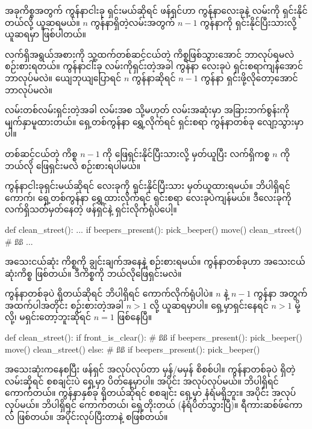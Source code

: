 အခုကိစ္စအတွက် ကွန်နာငါးခု ရှင်းမယ်ဆိုရင်  ဖန်ရှင်ဟာ ကွန်နာလေးခုနဲ့ လမ်းကို ရှင်းနိုင်တယ်လို့ ယူဆရမယ်။  $n$ ကွန်နာရှိတဲ့လမ်းအတွက် $n - 1$ ကွန်နာကို ရှင်းနိုင်ပြီးသားလို့ ယူဆရမှာ ဖြစ်ပါတယ်။


\begin{mytcbox}
လက်ရှိအရွယ်အစားကို သူ့ထက်တစ်ဆင့်ငယ်တဲ့ ကိစ္စဖြစ်သွားအောင် ဘာလုပ်ရမလဲ စဉ်းစားရတယ်။ ကွန်နာငါးခု လမ်းကိုရှင်းတဲ့အခါ ကွန်နာ လေးခုပဲ ရှင်းစရာကျန်အောင် ဘာလုပ်မလဲ။ ယျေဘုယျပြောရင် $n$ ကွန်နာဆိုရင် $n - 1$ ကွန်နာ ရှင်းဖို့လိုတော့အောင် ဘာလုပ်မလဲ။ 
\end{mytcbox}%

လမ်းတစ်လမ်းရှင်းတဲ့အခါ လမ်းအစ သို့မဟုတ် လမ်းအဆုံးမှာ အခြားဘက်စွန်းကို  မျက်နှာမူထားတယ်။ ရှေ့တစ်ကွန်နာ ရွှေ့လိုက်ရင်  ရှင်းစရာ ကွန်နာတစ်ခု လျော့သွားမှာပါ။

\begin{mytcbox}
တစ်ဆင့်ငယ်တဲ့ ကိစ္စ $n - 1$ ကို ဖြေရှင်းနိုင်ပြီးသားလို့ မှတ်ယူပြီး လက်ရှိကစ္စ $n$ ကို ဘယ်လို ဖြေရှင်းမလဲ စဉ်းစားရပါမယ်။
\end{mytcbox}%

ကွန်နာငါးခုရှင်းမယ်ဆိုရင် လေးခုကို ရှင်းနိုင်ပြီးသား မှတ်ယူထားရမယ်။ ဘိပါရှိရင်ကောက်၊ ရှေ့တစ်ကွန်နာ ရွှေ့ထားလိုက်ရင် ရှင်းစရာ လေးခုပဲကျန်မယ်။ ဒီလေးခုကို လက်ရှိသတ်မှတ်နေတဲ့ ဖန်ရှင်နဲ့ ရှင်းလိုက်ရုံပဲပေါ့။
%
\begin{py}
def clean_street():
    ...
    if beepers_present():
        pick_beeper()
    move()
    clean_street() # ßß
    ...
\end{py}
%
\begin{mytcbox}
    အသေးငယ်ဆုံး ကိစ္စကို ချွင်းချက်အနေနဲ့ စဉ်းစားရမယ်။   ကွန်နာတစ်ခုဟာ အသေးငယ်ဆုံးကိစ္စ ဖြစ်တယ်။ ဒီကိစ္စကို ဘယ်လိုဖြေရှင်းမလဲ။
\end{mytcbox}

ကွန်နာတစ်ခုပဲ ရှိတယ်ဆိုရင် ဘိပါရှိရင် ကောက်လိုက်ရုံပါပဲ။ $n$ နဲ့ $n - 1$ ကွန်နာ အတွက် အထက်ပါအတိုင်း စဉ်းစားတဲ့အခါ $n > 1$ လို့ ယူဆရမှာပါ။ ရှေ့မှာရှင်းနေရင် $n > 1$ မို့လို့၊ မရှင်းတော့ဘူးဆိုရင် $n = 1$ ဖြစ်နေပြီ။
%
\begin{py}
def clean_street():
    if front_is_clear():       # ßß
        if beepers_present():
            pick_beeper()
        move()
        clean_street()
    else:                      # ßß
        if beepers_present():
            pick_beeper() 
\end{py}
%
အသေးဆုံးကနေစပြီး ဖန်ရှင် အလုပ်လုပ်တာ မှန်/မမှန် စိစစ်ပါ။ ကွန်နာတစ်ခုပဲ ရှိတဲ့လမ်းဆိုရင် စစချင်းပဲ ရှေ့မှာ ပိတ်နေမှာပါ။  အပိုင်း အလုပ်လုပ်မယ်။ ဘိပါရှိရင် ကောက်တယ်။ ကွန်နာနှစ်ခု ရှိတယ်ဆိုရင် စစချင်း ရှေ့မှာ နံရံမရှိဘူး။  အပိုင်း အလုပ်လုပ်မယ်။ ဘိပါရှိရင် ကောက်တယ်၊ ရှေ့တိုးတယ် (နံရံပိတ်သွားပြီ)။  ရီကားဆစ်ဖ်ကောလ် ဖြစ်တယ်။  အပိုင်းလုပ်ပြီးတာနဲ့  စဖြစ်တယ်။


